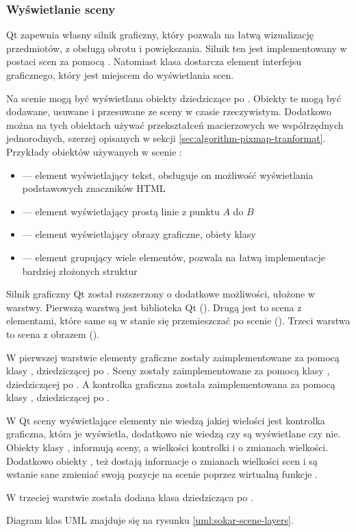 \subsubsection{Wyświetlanie sceny}
\par
Qt zapewnia własny silnik graficzny, który pozwala na łatwą wizualizację przedmiotów, z obsługą obrotu i powiększania.
Silnik ten jest implementowany w postaci scen za pomocą .
Natomiast klasa  dostarcza element interfejsu graficznego, który jest miejscem do wyświetlania scen.
\par
Na scenie mogą być wyświetlana obiekty dziedziczące po .
Obiekty te mogą być dodawane, usuwane i przesuwane ze sceny w czasie rzeczywistym.
Dodatkowo można na tych obiektach używać przekształceń macierzowych we współrzędnych jednorodnych, szerzej opisanych w sekcji \ref{sec:algorithm-pixmap-tranformat}.
Przykłady obiektów używanych w scenie :
\begin{itemize}
    \item {} --- element wyświetlający tekst, obsługuje on możliwość wyświetlania podstawowych znaczników HTML
    \item {} --- element wyświetlający prostą linie z punktu $A$ do $B$
    \item {} --- element wyświetlający obrazy graficzne, obiety klasy 
    \item {} --- element grupujący wiele elementów, pozwala na łatwą implementacje bardziej złożonych struktur
\end{itemize}
\par
Silnik graficzny Qt został rozszerzony o dodatkowe możliwości, ułożone w warstwy.
Pierwszą warstwą jest biblioteka Qt ().
Drugą jest to scena z elementami, które same są w stanie się przemieszczać po scenie ().
Trzeci warstwa to scena z obrazem \DICOM ().
\par
W pierwszej warstwie elementy graficzne zostały zaimplementowane za pomocą klasy , dziedziczącej po .
Sceny zostały zaimplementowane za pomocą klasy , dziedziczącej po .
A kontrolka graficzna została zaimplementowana za pomocą klasy , dziedziczącej po . 
\par
W Qt sceny wyświetlające elementy nie wiedzą jakiej wielości jest kontrolka graficzna, która je wyświetla, dodatkowo nie wiedzą czy są wyświetlane czy nie.
Obiekty klasy , informują sceny, a wielkości kontrolki i o zmianach wielkości.
Dodatkowo obiekty , też dostają informacje o zmianach wielkości scen i są wstanie sane zmieniać swoją pozycje na scenie poprzez wirtualną funkcje  .
\par
W trzeciej warstwie została dodana klasa  dziedzicząca po .
\par
Diagram klas UML znajduje się na rysunku \ref{uml:sokar-scene-layers}.

